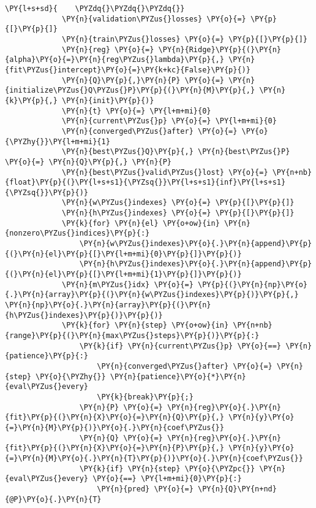 \begin{Verbatim}[commandchars=\\\{\}]
         \PY{l+s+sd}{    \PYZdq{}\PYZdq{}\PYZdq{}}
             \PY{n}{validation\PYZus{}losses} \PY{o}{=} \PY{p}{[}\PY{p}{]}
             \PY{n}{train\PYZus{}losses} \PY{o}{=} \PY{p}{[}\PY{p}{]}
             \PY{n}{reg} \PY{o}{=} \PY{n}{Ridge}\PY{p}{(}\PY{n}{alpha}\PY{o}{=}\PY{n}{reg\PYZus{}lambda}\PY{p}{,} \PY{n}{fit\PYZus{}intercept}\PY{o}{=}\PY{k+kc}{False}\PY{p}{)}
             \PY{n}{Q}\PY{p}{,}\PY{n}{P} \PY{o}{=} \PY{n}{initialize\PYZus{}Q\PYZus{}P}\PY{p}{(}\PY{n}{M}\PY{p}{,} \PY{n}{k}\PY{p}{,} \PY{n}{init}\PY{p}{)}
             \PY{n}{t} \PY{o}{=} \PY{l+m+mi}{0}
             \PY{n}{current\PYZus{}p} \PY{o}{=} \PY{l+m+mi}{0}
             \PY{n}{converged\PYZus{}after} \PY{o}{=} \PY{o}{\PYZhy{}}\PY{l+m+mi}{1}
             \PY{n}{best\PYZus{}Q}\PY{p}{,} \PY{n}{best\PYZus{}P} \PY{o}{=} \PY{n}{Q}\PY{p}{,} \PY{n}{P}
             \PY{n}{best\PYZus{}valid\PYZus{}lost} \PY{o}{=} \PY{n+nb}{float}\PY{p}{(}\PY{l+s+s1}{\PYZsq{}}\PY{l+s+s1}{inf}\PY{l+s+s1}{\PYZsq{}}\PY{p}{)}
             \PY{n}{w\PYZus{}indexes} \PY{o}{=} \PY{p}{[}\PY{p}{]}
             \PY{n}{h\PYZus{}indexes} \PY{o}{=} \PY{p}{[}\PY{p}{]}
             \PY{k}{for} \PY{n}{el} \PY{o+ow}{in} \PY{n}{nonzero\PYZus{}indices}\PY{p}{:}
                 \PY{n}{w\PYZus{}indexes}\PY{o}{.}\PY{n}{append}\PY{p}{(}\PY{n}{el}\PY{p}{[}\PY{l+m+mi}{0}\PY{p}{]}\PY{p}{)}
                 \PY{n}{h\PYZus{}indexes}\PY{o}{.}\PY{n}{append}\PY{p}{(}\PY{n}{el}\PY{p}{[}\PY{l+m+mi}{1}\PY{p}{]}\PY{p}{)}
             \PY{n}{m\PYZus{}idx} \PY{o}{=} \PY{p}{(}\PY{n}{np}\PY{o}{.}\PY{n}{array}\PY{p}{(}\PY{n}{w\PYZus{}indexes}\PY{p}{)}\PY{p}{,} \PY{n}{np}\PY{o}{.}\PY{n}{array}\PY{p}{(}\PY{n}{h\PYZus{}indexes}\PY{p}{)}\PY{p}{)}
             \PY{k}{for} \PY{n}{step} \PY{o+ow}{in} \PY{n+nb}{range}\PY{p}{(}\PY{n}{max\PYZus{}steps}\PY{p}{)}\PY{p}{:}
                 \PY{k}{if} \PY{n}{current\PYZus{}p} \PY{o}{==} \PY{n}{patience}\PY{p}{:}
                     \PY{n}{converged\PYZus{}after} \PY{o}{=} \PY{n}{step} \PY{o}{\PYZhy{}} \PY{n}{patience}\PY{o}{*}\PY{n}{eval\PYZus{}every}
                     \PY{k}{break}\PY{p}{;}
                 \PY{n}{P} \PY{o}{=} \PY{n}{reg}\PY{o}{.}\PY{n}{fit}\PY{p}{(}\PY{n}{X}\PY{o}{=}\PY{n}{Q}\PY{p}{,} \PY{n}{y}\PY{o}{=}\PY{n}{M}\PY{p}{)}\PY{o}{.}\PY{n}{coef\PYZus{}}
                 \PY{n}{Q} \PY{o}{=} \PY{n}{reg}\PY{o}{.}\PY{n}{fit}\PY{p}{(}\PY{n}{X}\PY{o}{=}\PY{n}{P}\PY{p}{,} \PY{n}{y}\PY{o}{=}\PY{n}{M}\PY{o}{.}\PY{n}{T}\PY{p}{)}\PY{o}{.}\PY{n}{coef\PYZus{}}
                 \PY{k}{if} \PY{n}{step} \PY{o}{\PYZpc{}} \PY{n}{eval\PYZus{}every} \PY{o}{==} \PY{l+m+mi}{0}\PY{p}{:}
                     \PY{n}{pred} \PY{o}{=} \PY{n}{Q}\PY{n+nd}{@P}\PY{o}{.}\PY{n}{T}

\end{Verbatim}
